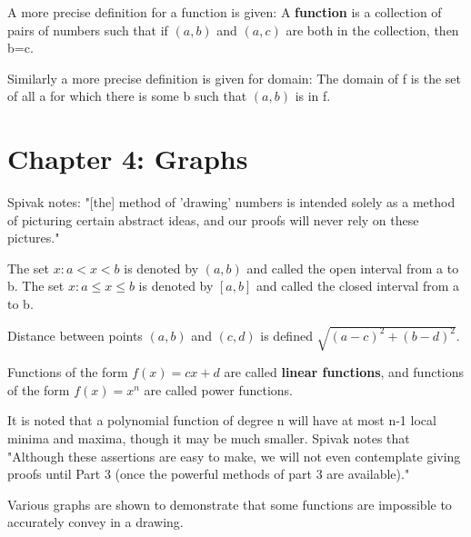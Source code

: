\documentclass{article}
\begin{document}
\begin{flushleft}
A more precise definition for a function is given: A \textbf{function} is a collection of pairs of numbers such that if $(a,b)$ and $(a,c)$ are both in the collection, then b=c.
\end{flushleft}

\begin{flushleft}
Similarly a more precise definition is given for domain: The domain of f is the set of all a for which there is some b such that $(a,b)$ is in f.
\end{flushleft}

\section*{Chapter 4: Graphs}

\begin{flushleft}
Spivak notes: "[the] method of 'drawing' numbers is intended solely as a method of picturing certain abstract ideas, and our proofs will never rely on these pictures."
\end{flushleft}

\begin{flushleft}
The set ${x: a < x < b}$ is denoted by $(a,b)$ and called the open interval from a to b. The set ${x: a \leq x \leq b}$ is denoted by $[a,b]$ and called the closed interval from a to b.
\end{flushleft}

\begin{flushleft}
Distance between points $(a,b)$ and $(c,d)$ is defined $\sqrt{(a-c)^2 + (b-d)^2}$.
\end{flushleft}

\begin{flushleft}
Functions of the form $f(x) = cx + d$ are called \textbf{linear functions}, and functions of the form $f(x) = x^n$ are called power functions.
\end{flushleft}

\begin{flushleft}
It is noted that a polynomial function of degree n will have at most n-1 local minima and maxima, though it may be much smaller. Spivak notes that "Although these assertions are easy to make, we will not even contemplate giving proofs until Part 3 (once the powerful methods of part 3 are available)."
\end{flushleft}

\begin{flushleft}
Various graphs are shown to demonstrate that some functions are impossible to accurately convey in a drawing.
\end{flushleft}
\end{document}
